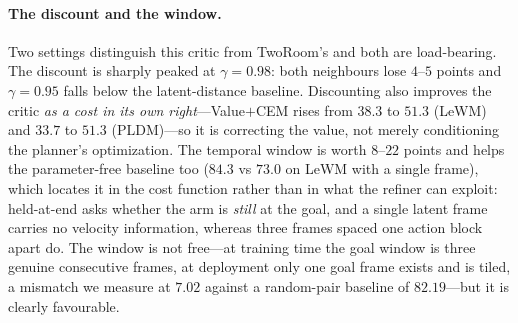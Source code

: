 \paragraph{The discount and the window.}
Two settings distinguish this critic from TwoRoom's and both are load-bearing.
The discount is sharply peaked at $\gamma = 0.98$: both neighbours lose $4$--$5$
points and $\gamma = 0.95$ falls below the latent-distance baseline. Discounting
also improves the critic \emph{as a cost in its own right}---Value$+$CEM rises
from $38.3$ to $51.3$ (LeWM) and $33.7$ to $51.3$ (PLDM)---so it is correcting
the value, not merely conditioning the planner's optimization. The temporal
window is worth $8$--$22$ points and helps the parameter-free baseline too
($84.3$ vs $73.0$ on LeWM with a single frame), which locates it in the cost
function rather than in what the refiner can exploit: held-at-end asks whether
the arm is \emph{still} at the goal, and a single latent frame carries no
velocity information, whereas three frames spaced one action block apart do. The
window is not free---at training time the goal window is three genuine
consecutive frames, at deployment only one goal frame exists and is tiled, a
mismatch we measure at $7.02$ against a random-pair baseline of $82.19$---but it
is clearly favourable.

